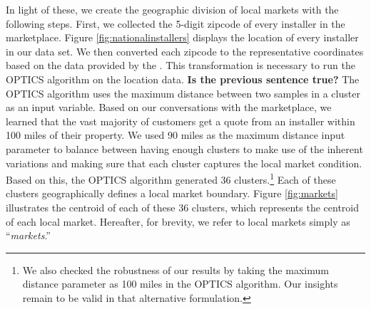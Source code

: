 \documentclass[msom,blindrev]{informs3}
\begin{document}
In light of these, we create the geographic division of local markets with the following steps. First, we collected the 5-digit zipcode of
every installer in the marketplace. Figure \ref{fig:nationalinstallers} displays the location of every installer in our data set. We then converted each zipcode  to the representative coordinates based on the data provided by the \citet{us_census_bureau_2019}. This transformation is necessary to run the OPTICS algorithm on the location data. \textbf{Is the previous sentence true?} The OPTICS algorithm uses the maximum distance between two samples in a cluster as an input variable. Based on our conversations with the marketplace, we learned that the vast majority of customers get a quote from an installer within 100 miles of their property. We used 90 miles as the maximum distance input parameter to balance between having enough clusters to make use of the inherent variations and making sure that each cluster captures the local market condition. Based on this, the OPTICS algorithm generated 36 clusters.\footnote{We also checked the robustness of our results by taking the maximum distance parameter as 100 miles in the OPTICS algorithm. Our insights remain to be valid in that alternative formulation.} Each of these clusters geographically defines a local market boundary. Figure \ref{fig:markets} illustrates the centroid of each of these 36 clusters, which represents the centroid of each local market. Hereafter, for brevity, we refer to local markets simply as ``\emph{markets}.''



\end{document}
